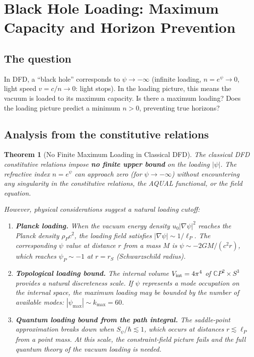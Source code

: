 \documentclass[11pt,a4paper]{article}
\newtheorem{theorem}{Theorem}[section]
\newcommand{\CP}{\mathbb{C}P}
\begin{document}
\section{Black Hole Loading: Maximum Capacity and Horizon Prevention}
\label{sec:black-holes}

\subsection{The question}

In DFD, a ``black hole'' corresponds to $\psi \to -\infty$ (infinite loading,
$n = e^\psi \to 0$, light speed $v = c/n \to 0$: light stops).  In the
loading picture, this means the vacuum is loaded to its maximum capacity.  Is
there a maximum loading?  Does the loading picture predict a minimum $n > 0$,
preventing true horizons?

\subsection{Analysis from the constitutive relations}

\begin{theorem}[No Finite Maximum Loading in Classical DFD]
\label{thm:no-max-loading}
The classical DFD constitutive relations impose \textbf{no finite upper bound}
on the loading $|\psi|$.  The refractive index $n = e^\psi$ can approach zero
(for $\psi \to -\infty$) without encountering any singularity in the
constitutive relations, the AQUAL functional, or the field equation.

However, physical considerations suggest a natural loading cutoff:
\begin{enumerate}
\item[(a)] \textbf{Planck loading.}  When the vacuum energy density
$u_0|\nabla\psi|^2$ reaches the Planck density $\rho_P c^2$, the
loading field satisfies $|\nabla\psi| \sim 1/\ell_P$.  The
corresponding $\psi$ value at distance $r$ from a mass $M$ is
$\psi \sim -2GM/(c^2 r)$, which reaches $\psi_P \sim -1$ at
$r = r_S$ (Schwarzschild radius).

\item[(b)] \textbf{Topological loading bound.}  The internal volume
$V_{\rm int} = 4\pi^4$ of $\CP^2 \times S^3$ provides a natural
discreteness scale.  If $\psi$ represents a mode occupation on the
internal space, the maximum loading may be bounded by the number
of available modes: $|\psi_{\max}| \sim k_{\max} = 60$.

\item[(c)] \textbf{Quantum loading bound from the path integral.}  The
saddle-point approximation breaks down when $S_\psi/\hbar \lesssim 1$,
which occurs at distances $r \lesssim \ell_P$ from a point mass.  At
this scale, the constraint-field picture fails and the full quantum
theory of the vacuum loading is needed.
\end{enumerate}
\end{theorem}
\end{document}
